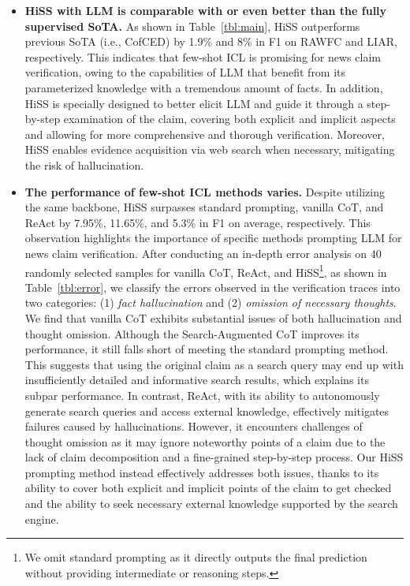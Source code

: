 \documentclass[11pt]{article}
\begin{document}
\begin{itemize}[leftmargin=*]


\item \textbf{HiSS with LLM is comparable with or even better than the fully supervised SoTA.} As shown in Table~\ref{tbl:main}, HiSS outperforms previous SoTA (i.e., CofCED) by 1.9\% and 8\% in F1 on RAWFC and LIAR, respectively.
This indicates that few-shot ICL is promising for news claim verification, owing to the capabilities of LLM that benefit from its parameterized knowledge with a tremendous amount of facts.
In addition, HiSS is specially designed to better elicit LLM and guide it through a step-by-step examination of the claim, covering both explicit and implicit aspects and allowing for more comprehensive and thorough verification. Moreover, HiSS enables evidence acquisition via web search when necessary, mitigating the risk of hallucination.
\item \textbf{The performance of few-shot ICL methods varies.} Despite utilizing the same backbone, HiSS surpasses standard prompting, vanilla CoT, and ReAct by 7.95\%, 11.65\%, and 5.3\% in F1 on average, respectively. This observation highlights the importance of specific methods prompting LLM for news claim verification. After conducting an in-depth error analysis on 40 randomly selected samples for vanilla CoT, ReAct, and HiSS\footnote{We omit standard prompting as it directly outputs the final prediction without providing intermediate or reasoning steps.}, as shown in Table~\ref{tbl:error}, we classify the errors observed in the verification traces into two categories: (1) \textit{fact hallucination} and (2) \textit{omission of necessary thoughts}. We find that vanilla CoT exhibits substantial issues of both hallucination and thought omission. 
Although the Search-Augmented CoT improves its performance, it still falls short of meeting the standard prompting method. This suggests that using the original claim as a search query may end up with insufficiently detailed and informative search results, which explains its subpar performance.
In contrast, ReAct, with its ability to autonomously generate search queries and access external knowledge, effectively mitigates failures caused by hallucinations. However, it encounters challenges of thought omission as it may ignore noteworthy points of a claim due to the lack of claim decomposition and a fine-grained step-by-step process.
Our HiSS prompting method instead effectively addresses both issues, thanks to its ability to cover both explicit and implicit points of the claim to get checked and the ability to seek necessary external knowledge supported by the search engine.
\end{itemize}
\end{document}
